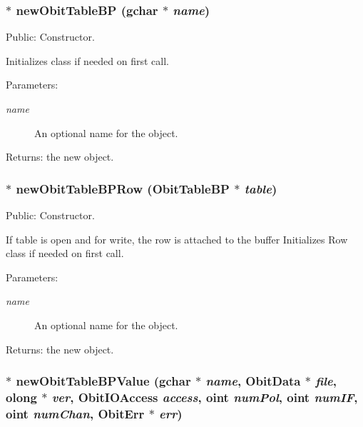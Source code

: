 \subsubsection{$\ast$ new\-Obit\-Table\-BP (gchar $\ast$ {\em name})}\label{ObitTableBP_8c_a16}


Public: Constructor. 

Initializes class if needed on first call. \begin{Desc}
\item[Parameters:]
\begin{description}
\item[{\em name}]An optional name for the object. \end{description}
\end{Desc}
\begin{Desc}
\item[Returns:]the new object. \end{Desc}
\subsubsection{$\ast$ new\-Obit\-Table\-BPRow ({\bf Obit\-Table\-BP} $\ast$ {\em table})}\label{ObitTableBP_8c_a14}


Public: Constructor. 

If table is open and for write, the row is attached to the buffer Initializes Row class if needed on first call. \begin{Desc}
\item[Parameters:]
\begin{description}
\item[{\em name}]An optional name for the object. \end{description}
\end{Desc}
\begin{Desc}
\item[Returns:]the new object. \end{Desc}
\subsubsection{$\ast$ new\-Obit\-Table\-BPValue (gchar $\ast$ {\em name}, {\bf Obit\-Data} $\ast$ {\em file}, {\bf olong} $\ast$ {\em ver}, Obit\-IOAccess {\em access}, {\bf oint} {\em num\-Pol}, {\bf oint} {\em num\-IF}, {\bf oint} {\em num\-Chan}, {\bf Obit\-Err} $\ast$ {\em err})}\label{ObitTableBP_8c_a18}



